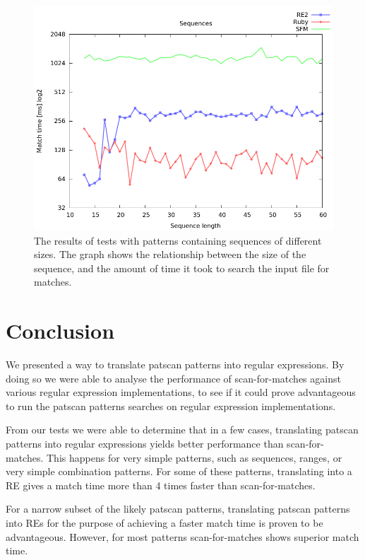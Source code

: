 \documentclass[12pt]{article}
\theoremstyle{definition}
\begin{document}
\begin{figure}[H]
	\begin{center}
		\includegraphics[scale=0.55]{graphs/sequences.png}	
	\end{center}
	\caption{The results of tests with patterns containing sequences of different sizes. The graph shows the relationship between the size of the sequence, and the amount of time it took to search the input file for matches.}
	\label{graph:cases:sequences}
\end{figure}


\newpage
\section{Conclusion}

We presented a way to translate patscan patterns into regular expressions. By doing so we were able to analyse the performance of scan-for-matches against various regular expression implementations, to see if it could prove advantageous to run the patscan patterns searches on regular expression implementations.

From our tests we were able to determine that in a few cases, translating patscan patterns into regular expressions yields better performance than scan-for-matches. This happens for very simple patterns, such as sequences, ranges, or very simple combination patterns. For some of these patterns, translating into a RE gives a match time more than 4 times faster than scan-for-matches.

For a narrow subset of the likely patscan patterns, translating patscan patterns into REs for the purpose of achieving a faster match time is proven to be advantageous. However, for most patterns scan-for-matches shows superior match time.
\end{document}
